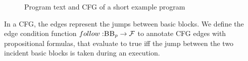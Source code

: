 \begin{figure}
\begin{minipage}{.6\textwidth}
    \end{minipage}\hfill
    \caption{Program text and CFG of a short example program}
    \label{fig:doubleIf}
\end{figure}

In a CFG, the edges represent the jumps between basic blocks. We define the edge condition function $follow: \mbb_p \to \mbform$ to annotate CFG edges with propositional formulas, that evaluate to true iff the jump between the two incident basic blocks is taken during an execution.


    


